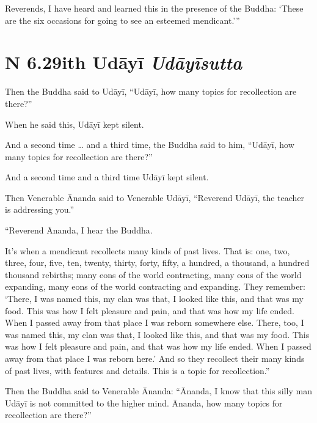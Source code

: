 \documentclass[12pt,openany]{book}%
\newcommand*{\suttatitleacronym}[1]{\smaller[2]{#1}\vspace*{.3em}}
\newcommand*{\suttatitletranslation}[1]{\linebreak{#1}}
\newcommand*{\suttatitleroot}[1]{\linebreak\smaller[2]\itshape{#1}}
\newcommand*{\tocacronym}[1]{\hspace*{-3.3em}{#1}\quad}
\newcommand*{\toctranslation}[1]{#1}
\newcommand*{\tocroot}[1]{(\textit{#1})}
\begin{document}
Reverends, I have heard and learned this in the presence of the Buddha: ‘These are the six occasions for going to see an esteemed mendicant.’” 

%
\section*{{\suttatitleacronym AN 6.29}{\suttatitletranslation With Udāyī }{\suttatitleroot Udāyīsutta}}
\addcontentsline{toc}{section}{\tocacronym{AN 6.29} \toctranslation{With Udāyī } \tocroot{Udāyīsutta}}

Then the Buddha said to \textsanskrit{Udāyī}, “\textsanskrit{Udāyī}, how many topics for recollection are there?” 

When he said this, \textsanskrit{Udāyī} kept silent. 

And a second time … and a third time, the Buddha said to him, “\textsanskrit{Udāyī}, how many topics for recollection are there?” 

And a second time and a third time \textsanskrit{Udāyī} kept silent. 

Then Venerable Ānanda said to Venerable \textsanskrit{Udāyī}, “Reverend \textsanskrit{Udāyī}, the teacher is addressing you.” 

“Reverend Ānanda, I hear the Buddha. 

It’s when a mendicant recollects many kinds of past lives. That is: one, two, three, four, five, ten, twenty, thirty, forty, fifty, a hundred, a thousand, a hundred thousand rebirths; many eons of the world contracting, many eons of the world expanding, many eons of the world contracting and expanding. They remember: ‘There, I was named this, my clan was that, I looked like this, and that was my food. This was how I felt pleasure and pain, and that was how my life ended. When I passed away from that place I was reborn somewhere else. There, too, I was named this, my clan was that, I looked like this, and that was my food. This was how I felt pleasure and pain, and that was how my life ended. When I passed away from that place I was reborn here.’ And so they recollect their many kinds of past lives, with features and details. This is a topic for recollection.” 

Then the Buddha said to Venerable Ānanda: “Ānanda, I know that this silly man \textsanskrit{Udāyī} is not committed to the higher mind. Ānanda, how many topics for recollection are there?” 
\end{document}
